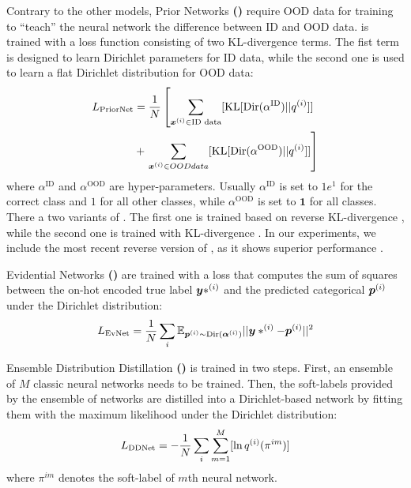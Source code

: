 Contrary to the other models, Prior Networks \textbf{(\PriorNet)} \citep{malini2018, malinin2019}  require OOD data for training to ``teach'' the neural network the difference between ID and OOD data. \PriorNet is trained with a loss function consisting of two KL-divergence terms. The fist term is designed to learn Dirichlet parameters for ID data, while the second one is used to learn a flat Dirichlet distribution %
for OOD data: 
%
\begin{equation}
\begin{aligned}
    L_{\mathrm{PriorNet}} &= \frac{1}{N} \left[\sum_{{\bm{x}}^{(i)} \in \text{ID data}}  [\mathrm{KL} [\mathrm{Dir} (\alpha^{\mathrm{ID}}) || q^{(i)}]]  \right. \\
                           &+ \left.\sum_{{\bm{x}}^{(i)} \in OOD data} [\mathrm{KL} [\mathrm{Dir} (\alpha^{\mathrm{OOD}}) || q^{(i)}]]\right] \\
\end{aligned}
\end{equation}
%
where $\alpha^{\mathrm{ID}}$ and $\alpha^{\mathrm{OOD}}$ are hyper-parameters. Usually $\alpha^{\mathrm{ID}}$ is set to $1e^{1}$ for the correct class and $1$ for all other classes, while $\alpha^{\mathrm{OOD}}$ is set to $\mathbf{1}$ for all classes.
%
There a two variants of \PriorNet. The first one is trained based on reverse KL-divergence \citep{malinin2019}, while the second one is trained with KL-divergence \citep{malini2018}. In our experiments, we include the most recent reverse version of \PriorNet, as it shows superior performance \citep{malinin2019}. 

Evidential Networks \textbf{(\EvNet)} \citep{sensoy2018} are trained with a loss that computes the sum of squares between the on-hot encoded true label ${\bm{y}}*^{(i)}$ and the predicted categorical ${\bm{p}}^{(i)}$ under the Dirichlet distribution:
%
\begin{equation}
\begin{aligned}
    L_{\mathrm{EvNet}} &= \frac{1}{N} \sum_i \mathbb{E}_{{\bm{p}}^{(i)} \sim \text{Dir}(\bm{\alpha}^{(i)})}||{\bm{y}}*^{(i)} - {\bm{p}}^{(i)}||^2 \\
\end{aligned}
\end{equation}

Ensemble Distribution Distillation \textbf{(\DDNet)} \citep{malinin2019ensemble} is trained in two steps. First, an ensemble of $M$ classic neural networks needs to be trained. 
Then, the soft-labels  provided by the ensemble of networks are distilled into a Dirichlet-based network by fitting them with the maximum likelihood under the Dirichlet distribution: 
\begin{equation}
\begin{aligned}
    L_{\mathrm{DDNet}} &= - \frac{1}{N}  \sum_i \sum_{m=1}^{M} [\ln q^{(i)}(\pi^{im})] \\
\end{aligned}
\end{equation}
where $\pi^{im}$ denotes the soft-label of $m$th neural network. 

